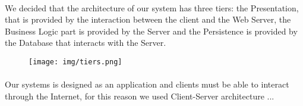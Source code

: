 	
	\paragraph{} We decided that the architecture of our system has three tiers: the Presentation, that is provided by the interaction between the client and the Web Server, the Business Logic part is provided by the Server and the Persistence is provided by the Database that interacts with the Server.  	
	
		\begin{figure}[h]
			\texttt{[image: img/tiers.png]}
		\end{figure}
		
	\paragraph{} Our systems is designed as an application and clients must be able to interact through the Internet, for this reason we used Client-Server architecture  ...
	
		